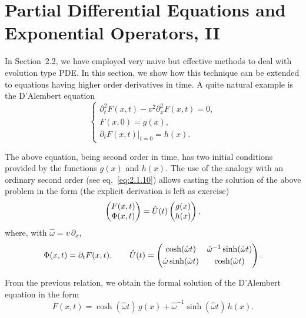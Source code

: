 \section{Partial Differential Equations and Exponential Operators, II}

In Section~2.2, we have employed very naive but effective methods to deal with evolution type PDE. In this section, we show how this technique can be extended to equations having higher order derivatives in time. A quite natural example is the D'Alembert equation
\begin{equation}
\begin{cases}
\partial_{t}^{2}F(x,t)-v^{2}\partial_{x}^{2}F(x,t)=0,\\[1mm]
F(x,0)=g(x),\\
\partial_{t}F(x,t)\big|_{t=0}=h(x).
\end{cases}
\label{eq:2.3.1}
\end{equation}

The above equation, being second order in time, has two initial conditions provided by the functions $g(x)$ and $h(x)$. The use of the analogy with an ordinary second order (see eq.~\eqref{eq:2.1.10}) allows casting the solution of the above problem in the form (the explicit derivation is left as exercise)
\begin{equation}
\begin{pmatrix}F(x,t)\\\Phi(x,t)\end{pmatrix}=\hat{U}(t)\begin{pmatrix}g(x)\\h(x)\end{pmatrix},
\label{eq:2.3.2}
\end{equation}
where, with $\hat{\omega}=v\,\partial_{x}$,
\begin{equation}
\Phi(x,t)=\partial_{t}F(x,t),\qquad
\hat{U}(t)=
\begin{pmatrix}\cosh(\hat{\omega}t)&\hat{\omega}^{-1}\sinh(\hat{\omega}t)\\[1mm]
\hat{\omega}\sinh(\hat{\omega}t)&\cosh(\hat{\omega}t)\end{pmatrix}.
\label{eq:2.3.3}
\end{equation}

From the previous relation, we obtain the formal solution of the D'Alembert equation in the form
\begin{equation}
F(x,t)=\cosh(\hat{\omega}t)\,g(x)
+\hat{\omega}^{-1}\sinh(\hat{\omega}t)\,h(x).
\label{eq:2.3.4}
\end{equation}

